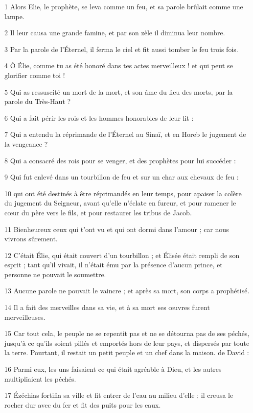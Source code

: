 \par 1 Alors Elie, le prophète, se leva comme un feu, et sa parole brûlait comme une lampe.
\par 2 Il leur causa une grande famine, et par son zèle il diminua leur nombre.
\par 3 Par la parole de l'Éternel, il ferma le ciel et fit aussi tomber le feu trois fois.
\par 4 Ô Élie, comme tu as été honoré dans tes actes merveilleux ! et qui peut se glorifier comme toi !
\par 5 Qui as ressuscité un mort de la mort, et son âme du lieu des morts, par la parole du Très-Haut ?
\par 6 Qui a fait périr les rois et les hommes honorables de leur lit :
\par 7 Qui a entendu la réprimande de l'Éternel au Sinaï, et en Horeb le jugement de la vengeance ?
\par 8 Qui a consacré des rois pour se venger, et des prophètes pour lui succéder :
\par 9 Qui fut enlevé dans un tourbillon de feu et sur un char aux chevaux de feu :
\par 10 qui ont été destinés à être réprimandés en leur temps, pour apaiser la colère du jugement du Seigneur, avant qu'elle n'éclate en fureur, et pour ramener le cœur du père vers le fils, et pour restaurer les tribus de Jacob.
\par 11 Bienheureux ceux qui t'ont vu et qui ont dormi dans l'amour ; car nous vivrons sûrement.
\par 12 C'était Élie, qui était couvert d'un tourbillon ; et Élisée était rempli de son esprit ; tant qu'il vivait, il n'était ému par la présence d'aucun prince, et personne ne pouvait le soumettre.
\par 13 Aucune parole ne pouvait le vaincre ; et après sa mort, son corps a prophétisé.
\par 14 Il a fait des merveilles dans sa vie, et à sa mort ses œuvres furent merveilleuses.
\par 15 Car tout cela, le peuple ne se repentit pas et ne se détourna pas de ses péchés, jusqu'à ce qu'ils soient pillés et emportés hors de leur pays, et dispersés par toute la terre. Pourtant, il restait un petit peuple et un chef dans la maison. de David :
\par 16 Parmi eux, les uns faisaient ce qui était agréable à Dieu, et les autres multipliaient les péchés.
\par 17 Ézéchias fortifia sa ville et fit entrer de l'eau au milieu d'elle ; il creusa le rocher dur avec du fer et fit des puits pour les eaux.

